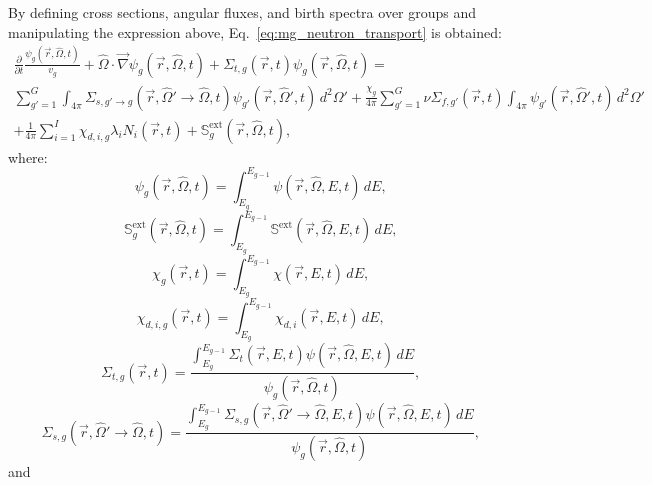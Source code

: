 By defining cross sections, angular fluxes, and birth spectra over groups and manipulating the expression above, Eq.~\ref{eq:mg_neutron_transport} is obtained:
\begin{multline}\label{eq:mg_neutron_transport}
    \frac{\partial}{\partial t}\frac{\psi_{g}(\vec{r}, \hat{\Omega}, t)}{v_{g}} + \hat{\Omega}\cdot\vec{\nabla}\psi_{g}(\vec{r}, \hat{\Omega}, t) + \Sigma_{t,g}(\vec{r}, t)\psi_{g}(\vec{r}, \hat{\Omega}, t)
    = 
    \\\sum_{g' = 1}^{G}\int_{4\pi} \Sigma_{s,g'\rightarrow g}(\vec{r}, \hat{\Omega}' \rightarrow \hat{\Omega}, t)\psi_{g'}(\vec{r}, \hat{\Omega}', t)\, d^{2}\Omega'
    + \frac{\chi_{g}}{4\pi}\sum_{g' = 1}^{G} \nu\Sigma_{f,g'}(\vec{r}, t)\int_{4\pi}\psi_{g'}(\vec{r}, \hat{\Omega}', t)\, d^{2}\Omega'
    \\+ \frac{1}{4\pi}\sum_{i = 1}^{I} \chi_{d,i,g}\lambda_{i}N_{i}(\vec{r}, t) + \mathbb{S}^{\text{ext}}_{g}(\vec{r}, \hat{\Omega}, t)
    \text{,}
\end{multline}
where:
\begin{equation*}
    \psi_{g}(\vec{r}, \hat{\Omega}, t) = \int_{E_{g}}^{E_{g - 1}}\psi(\vec{r}, \hat{\Omega}, E, t)\, dE\text{,}
\end{equation*}
\begin{equation*}
    \mathbb{S}^{\text{ext}}_{g}(\vec{r}, \hat{\Omega}, t) = \int_{E_{g}}^{E_{g - 1}}\mathbb{S}^{\text{ext}}(\vec{r}, \hat{\Omega}, E, t)\, dE\text{,}
\end{equation*}
\begin{equation*}
    \chi_{g}(\vec{r}, t) = \int_{E_{g}}^{E_{g - 1}}\chi(\vec{r}, E, t)\, dE\text{,}
\end{equation*}
\begin{equation*}
    \chi_{d,i,g}(\vec{r}, t) = \int_{E_{g}}^{E_{g - 1}}\chi_{d,i}(\vec{r}, E, t)\, dE\text{,}
\end{equation*}
\begin{equation*}
    \Sigma_{t,g}(\vec{r}, t) = \frac{\int_{E_{g}}^{E_{g - 1}}\Sigma_{t}(\vec{r}, E, t)\psi(\vec{r}, \hat{\Omega}, E, t)\, dE}{\psi_{g}(\vec{r}, \hat{\Omega}, t)}\text{,}
\end{equation*}
\begin{equation*}
    \Sigma_{s,g}(\vec{r}, \hat{\Omega}'\rightarrow\hat{\Omega}, t) = \frac{\int_{E_{g}}^{E_{g - 1}}\Sigma_{s,g}(\vec{r}, \hat{\Omega}'\rightarrow\hat{\Omega}, E, t)\psi(\vec{r}, \hat{\Omega}, E, t)\, dE}{\psi_{g}(\vec{r}, \hat{\Omega}, t)}\text{,}
\end{equation*}
and

